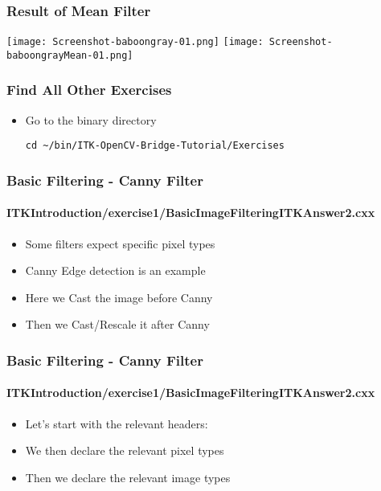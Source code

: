 \begin{frame}[fragile]
\frametitle{Result of Mean Filter}
\begin{center}
  \texttt{[image: Screenshot-baboongray-01.png]}
  \texttt{[image: Screenshot-baboongrayMean-01.png]}
\end{center}
\end{frame}

\begin{frame}[fragile]
\frametitle{Find All Other Exercises}
\begin{itemize}
\item Go to the binary directory
\begin{verbatim}
cd ~/bin/ITK-OpenCV-Bridge-Tutorial/Exercises
\end{verbatim}
\end{itemize}
\end{frame}

\begin{frame}
\frametitle{Basic Filtering - Canny Filter}
\framesubtitle{ITKIntroduction/exercise1/BasicImageFilteringITKAnswer2.cxx}
\begin{itemize}
\item Some filters expect specific pixel types
\pause
\item Canny Edge detection is an example
\pause
\item Here we Cast the image before Canny
\pause
\item Then we Cast/Rescale it after Canny
\end{itemize}
\end{frame}

\begin{frame}
\frametitle{Basic Filtering - Canny Filter}
\framesubtitle{ITKIntroduction/exercise1/BasicImageFilteringITKAnswer2.cxx}
\begin{itemize}
\item Let's start with the relevant headers:
\pause
{}
\pause
\item We then declare the relevant pixel types
\pause
{}
\pause
\item Then we declare the relevant image types
\pause
{}
\end{itemize}
\end{frame}

